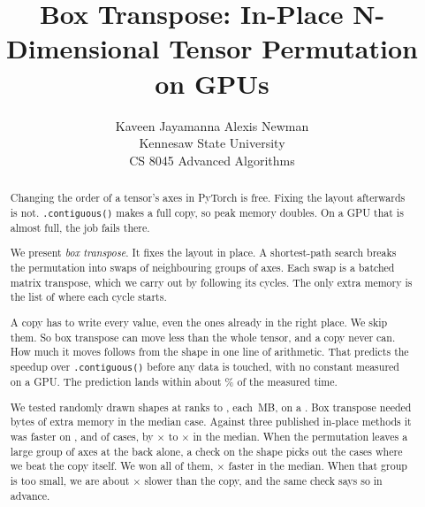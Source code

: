 \documentclass[letterpaper,twocolumn,10pt]{article}
\begin{document}
\title{\Large \bf Box Transpose: In-Place N-Dimensional Tensor Permutation on GPUs}

\author{
{\rm Kaveen Jayamanna \quad Alexis Newman}\\
Kennesaw State University\\
{\rm CS 8045 Advanced Algorithms}
}

\maketitle

\begin{abstract}
Changing the order of a tensor's axes in PyTorch is free. Fixing the layout
afterwards is not. \texttt{.contiguous()} makes a full copy, so peak memory
doubles. On a GPU that is almost full, the job fails there.

We present \emph{box transpose}. It fixes the layout in place. A shortest-path
search breaks the permutation into swaps of neighbouring groups of axes. Each
swap is a batched matrix transpose, which we carry out by following its cycles.
The only extra memory is the list of where each cycle starts.

A copy has to write every value, even the ones already in the right place. We
skip them. So box transpose can move less than the whole tensor, and a copy
never can. How much it moves follows from the shape in one line of arithmetic.
That predicts the speedup over \texttt{.contiguous()} before any data is
touched, with no constant measured on a GPU. The prediction lands within about
\modelErrIn\% of the measured time.

We tested \resCases{} randomly drawn shapes at ranks \resRankLo{} to
\resRankHi{}, each \resTensorMB{}\,MB, on a \resDevice{}. Box transpose needed
\resBoxAux{} bytes of extra memory in the median case. Against three published
in-place methods it was faster on \resWinIttpd{}, \resWinGl{} and \resWinGv{}
of \resCases{} cases, by \methTabIttpdX{}$\times$ to \methTabGvX{}$\times$ in
the median. When the permutation leaves a large group of axes at the back
alone, a check on the shape picks out the cases where we beat the copy itself.
We won all \gateCases{} of them, \gateMedianX{}$\times$ faster in the median.
When that group is too small, we are about \hardSmallSlowdown{}$\times$ slower
than the copy, and the same check says so in advance.
\end{abstract}











\end{document}
